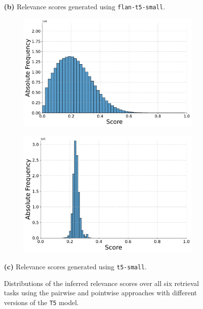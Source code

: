 \begin{figure}[ht!]
    \vspace{-0.5cm}
    \textbf{(b)} Relevance scores generated using \texttt{flan-t5-small}.
    \vspace{0.5cm}

    \begin{subfigure}[b]{0.49\textwidth}
        \centering
        \includegraphics[width=\textwidth]{graphics/evaluation/pairwise_score_distribution_t5-small.pdf}
        \label{fig:pairwise_t5-small}
    \end{subfigure}
    \hfill
    \begin{subfigure}[b]{0.49\textwidth}
        \centering
        \includegraphics[width=\textwidth]{graphics/evaluation/pointwise_score_distribution_t5-small.pdf}
        \label{fig:pointwise_t5-small}
    \end{subfigure}

    \vspace{-0.5cm}
    \textbf{(c)} Relevance scores generated using \texttt{t5-small}.
    \vspace{0.5cm}

    \caption{Distributions of the inferred relevance scores over all six retrieval tasks using the pairwise and pointwise approaches with different versions of the \texttt{T5} model.}
    \label{fig:score-distributions}
\end{figure}

